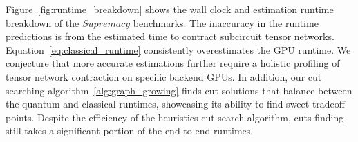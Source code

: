 Figure~\ref{fig:runtime_breakdown} shows the wall clock and estimation runtime breakdown of the $Supremacy$ benchmarks.
The inaccuracy in the runtime predictions is from the estimated time to contract subcircuit tensor networks.
Equation~\ref{eq:classical_runtime} consistently overestimates the GPU runtime.
We conjecture that more accurate estimations further require a holistic profiling of tensor network contraction on specific backend GPUs.
In addition, our cut searching algorithm~\ref{alg:graph_growing} finds cut solutions that balance between the quantum and classical runtimes,
showcasing its ability to find sweet tradeoff points.
Despite the efficiency of the heuristics cut search algorithm,
cuts finding still takes a significant portion of the end-to-end runtimes.